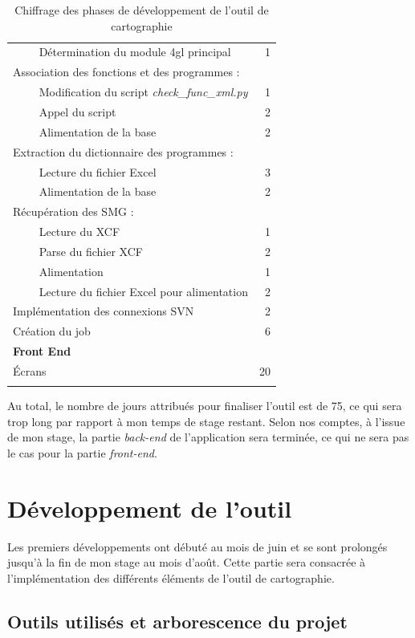 \documentclass{polytech/polytech}
\begin{document}
\begin{longtable}{|L{12cm}|r|}
	~~\llap{\textbullet}~~ Détermination du module 4gl principal & 1 \\
	Association des fonctions et des programmes : & \\
	~~\llap{\textbullet}~~ Modification du script \textit{check\_func\_xml.py} & 1 \\ 
	~~\llap{\textbullet}~~ Appel du script & 2 \\ 
	~~\llap{\textbullet}~~ Alimentation de la base & 2 \\ 
	Extraction du dictionnaire des programmes : & \\
	~~\llap{\textbullet}~~ Lecture du fichier Excel & 3 \\ 
	~~\llap{\textbullet}~~ Alimentation de la base & 2 \\ 
	Récupération des SMG : & \\
	~~\llap{\textbullet}~~ Lecture du XCF & 1 \\ 
	~~\llap{\textbullet}~~ Parse du fichier XCF & 2 \\ 
	~~\llap{\textbullet}~~ Alimentation & 1 \\ 
	~~\llap{\textbullet}~~ Lecture du fichier Excel pour alimentation & 2 \\ 
	Implémentation des connexions SVN & 2 \\
	\hline 
	Création du job	& 6 \\ 
	\hline 
	\textbf{Front End} &  \\ 
	Écrans & 20 \\
	\hline 
	\caption{Chiffrage des phases de développement de l'outil de cartographie }
\end{longtable} 


Au total, le nombre de jours attribués pour finaliser l'outil est de 75, ce qui sera trop long par rapport à mon temps de stage restant. Selon nos comptes, à l'issue de mon stage, la partie \textit{back-end} de l'application sera terminée, ce qui ne sera pas le cas pour la partie \textit{front-end}.


\part{Développement de l'outil}
\label{part:dev}

Les premiers développements ont débuté au mois de juin et se sont prolongés jusqu'à la fin de mon stage au mois d'août. Cette partie sera consacrée à l'implémentation des différents éléments de l'outil de cartographie.

\chapter{Outils utilisés et arborescence du projet}
\end{document}
